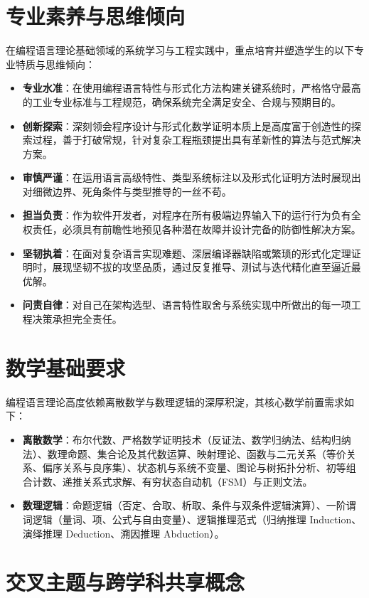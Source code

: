 \section{专业素养与思维倾向}

在编程语言理论基础领域的系统学习与工程实践中，重点培育并塑造学生的以下专业特质与思维倾向：
\begin{itemize}
    \item \textbf{专业水准}：在使用编程语言特性与形式化方法构建关键系统时，严格恪守最高的工业专业标准与工程规范，确保系统完全满足安全、合规与预期目的。
    \item \textbf{创新探索}：深刻领会程序设计与形式化数学证明本质上是高度富于创造性的探索过程，善于打破常规，针对复杂工程瓶颈提出具有革新性的算法与范式解决方案。
    \item \textbf{审慎严谨}：在运用语言高级特性、类型系统标注以及形式化证明方法时展现出对细微边界、死角条件与类型推导的一丝不苟。
    \item \textbf{担当负责}：作为软件开发者，对程序在所有极端边界输入下的运行行为负有全权责任，必须具有前瞻性地预见各种潜在故障并设计完备的防御性解决方案。
    \item \textbf{坚韧执着}：在面对复杂语言实现难题、深层编译器缺陷或繁琐的形式化定理证明时，展现坚韧不拔的攻坚品质，通过反复推导、测试与迭代精化直至逼近最优解。
    \item \textbf{问责自律}：对自己在架构选型、语言特性取舍与系统实现中所做出的每一项工程决策承担完全责任。
\end{itemize}

\section{数学基础要求}

编程语言理论高度依赖离散数学与数理逻辑的深厚积淀，其核心数学前置需求如下：
\begin{itemize}
    \item \textbf{离散数学}：布尔代数、严格数学证明技术（反证法、数学归纳法、结构归纳法）、数理命题、集合论及其代数运算、映射理论、函数与二元关系（等价关系、偏序关系与良序集）、状态机与系统不变量、图论与树拓扑分析、初等组合计数、递推关系式求解、有穷状态自动机（FSM）与正则文法。
    \item \textbf{数理逻辑}：命题逻辑（否定、合取、析取、条件与双条件逻辑演算）、一阶谓词逻辑（量词、项、公式与自由变量）、逻辑推理范式（归纳推理 Induction、演绎推理 Deduction、溯因推理 Abduction）。
\end{itemize}

\section{交叉主题与跨学科共享概念}

